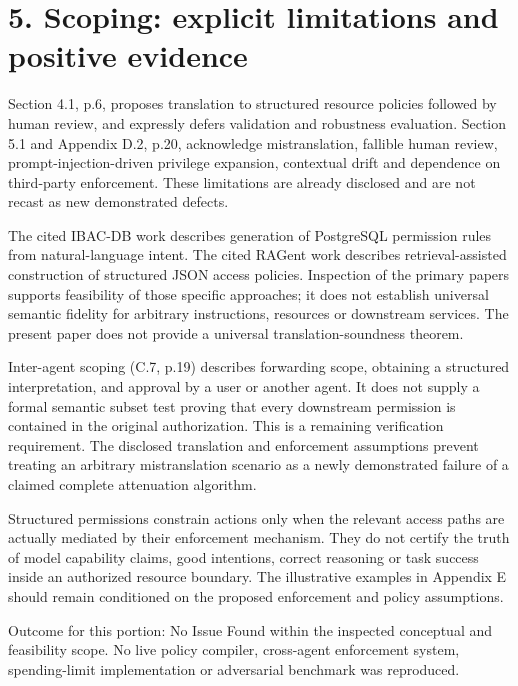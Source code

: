 \documentclass[10pt]{article}
\begin{document}
\section*{5. Scoping: explicit limitations and positive evidence}
Section 4.1, p.6, proposes translation to structured resource policies followed by human review, and expressly defers validation and robustness evaluation. Section 5.1 and Appendix D.2, p.20, acknowledge mistranslation, fallible human review, prompt-injection-driven privilege expansion, contextual drift and dependence on third-party enforcement. These limitations are already disclosed and are not recast as new demonstrated defects.\par
The cited IBAC-DB work describes generation of PostgreSQL permission rules from natural-language intent. The cited RAGent work describes retrieval-assisted construction of structured JSON access policies. Inspection of the primary papers supports feasibility of those specific approaches; it does not establish universal semantic fidelity for arbitrary instructions, resources or downstream services. The present paper does not provide a universal translation-soundness theorem.\par
Inter-agent scoping (C.7, p.19) describes forwarding scope, obtaining a structured interpretation, and approval by a user or another agent. It does not supply a formal semantic subset test proving that every downstream permission is contained in the original authorization. This is a remaining verification requirement. The disclosed translation and enforcement assumptions prevent treating an arbitrary mistranslation scenario as a newly demonstrated failure of a claimed complete attenuation algorithm.\par
Structured permissions constrain actions only when the relevant access paths are actually mediated by their enforcement mechanism. They do not certify the truth of model capability claims, good intentions, correct reasoning or task success inside an authorized resource boundary. The illustrative examples in Appendix E should remain conditioned on the proposed enforcement and policy assumptions.\par
Outcome for this portion: No Issue Found within the inspected conceptual and feasibility scope. No live policy compiler, cross-agent enforcement system, spending-limit implementation or adversarial benchmark was reproduced.\par
\end{document}
